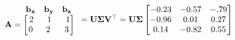 \documentclass[preview]{standalone}
\begin{document}
\begin{align*}
\begin{array}{ccc}\begin{matrix}\hspace{0.75cm} \mathbf{b_{x}} &  \mathbf{b_{y}} &  \mathbf{b_{z}} \end{matrix} \\ \mathbf{A} = \begin{bmatrix} 2 & \hspace{0.1cm} 1 \hspace{0.1cm}& \hspace{0.1cm} 1 \\ \hspace{0.04cm}  0 \hspace{0.1cm} & \hspace{0.1cm} 2 \hspace{0.1cm}\hspace{0.1cm} & 3 \end{bmatrix} \end{array}= \mathbf{U \Sigma V^\top}= \mathbf{U \Sigma} \begin{bmatrix} -0.23 & -0.57 & -.79 \\-0.96 & 0.01 & 0.27 \\ 0.14 & -0.82 & 0.55 \end{bmatrix}
\end{align*}
\end{document}
